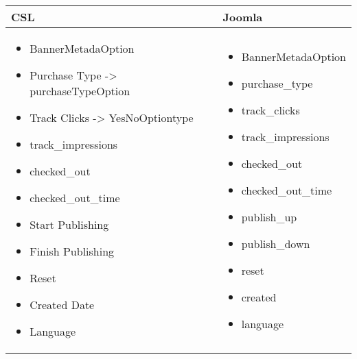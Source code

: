 \begin{minipage}{0.8\textwidth}
\begin{tabular}{|p{} | p{}|}
\hline
\textbf{CSL} & \textbf{Joomla} \\ 
\hline
\begin{itemize}
\item BannerMetadaOption
\item  Purchase Type -> purchaseTypeOption
\item  Track Clicks -> YesNoOptiontype
\item  track\_impressions
\item  checked\_out
\item  checked\_out\_time
\item  Start Publishing
\item  Finish Publishing
\item  Reset
\item  Created Date
\item  Language
\end{itemize}
 & 
\begin{itemize}
\item BannerMetadaOption
\item  purchase\_type
\item  track\_clicks
\item  track\_impressions
\item  checked\_out
\item  checked\_out\_time
\item  publish\_up
\item  publish\_down
\item  reset
\item  created
\item  language
\end{itemize}
\\
\hline
\end{tabular}
\end{minipage}

